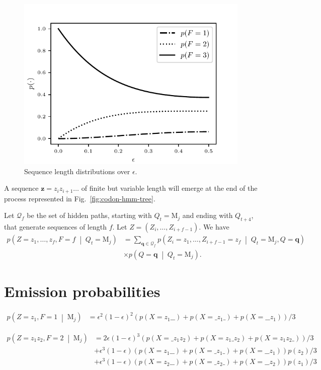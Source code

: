 \documentclass[a4paper]{article}
\theoremstyle{definition}
\theoremstyle{definition}
\newcommand{\cprob}[2]{p\left(#1\;\middle|\; #2\right)}
\newcommand{\eps}{\epsilon}
\newcommand{\s}{\texttt{\char`_}}
\begin{document}
\begin{figure}[htbp]
\centering
\includegraphics[scale=0.75]{seq-len-prob}
\caption{Sequence length distributions over $\eps$.}\label{fig:seq-len-prob}
\end{figure}

A sequence $\mathbf z=z_i z_{i+1}\dots$ of finite but variable length will emerge at the end of the process represented in Fig.~\ref{fig:codon-hmm-tree}.

Let $\mathcal Q_f$ be the set of hidden paths, starting with $Q_t=\mathrm M_j$ and ending with $Q_{t+4}$,
that generate sequences of length $f$.
Let $Z=(Z_i, \dots, Z_{i+f-1})$.
We have
\begin{align*}
    \cprob{Z=z_1,\dots,z_f,F=f}{Q_t=\mathrm M_j} &= \sum_{\mathbf q \in \mathcal Q_f}
            \cprob{Z_i=z_1,\dots,Z_{i+f-1}=z_f}{Q_t=\mathrm M_j, Q=\mathbf q}\\
        &\times\cprob{Q=\mathbf q}{Q_t=\mathrm M_j}.
\end{align*}

\section{Emission probabilities}

\begin{align*}
    \cprob{Z=z_1,F=1}{\mathrm M_j}
        &= \eps^2(1-\eps)^2(p(X=z_1\s\s) + p(X=\s z_1\s) + p(X=\s\s z_1)) / 3
\end{align*}

\begin{align*}
    \cprob{Z=z_1z_2,F=2}{\mathrm M_j}
        &= 2\eps(1-\eps)^3(p(X=\s z_1z_2) + p(X=z_1\s z_2) + p(X=z_1z_2\s))/3\\
        &+ \eps^3(1-\eps)(p(X=z_1\s\s) + p(X=\s z_1\s) + p(X=\s\s z_1))p(z_2)/3\\
        &+ \eps^3(1-\eps)(p(X=z_2\s\s) + p(X=\s z_2\s) + p(X=\s\s z_2))p(z_1)/3
\end{align*}
\end{document}
